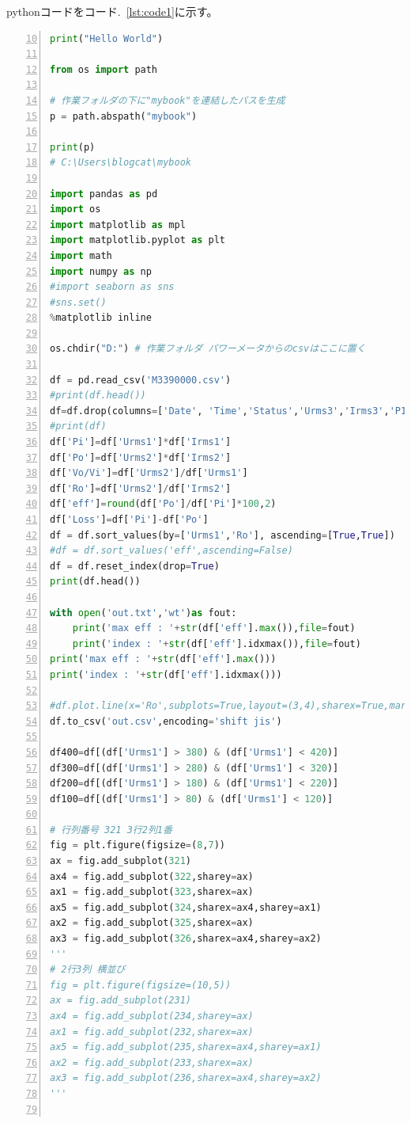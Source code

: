 \documentclass[
  10pt,
  a4paper,
  pandoc,
  titlepage]{ltjsarticle}
\begin{document}
pythonコードをコード.~\ref{lst:code1}に示す。

\begin{codelisting}

\caption{test.py}

\begin{lstlisting}[language=Python, numbers=left, firstnumber=10, caption={test.py}, label=lst:code1]
print("Hello World")

from os import path

# 作業フォルダの下に"mybook"を連結したパスを生成
p = path.abspath("mybook")

print(p)
# C:\Users\blogcat\mybook

import pandas as pd
import os
import matplotlib as mpl
import matplotlib.pyplot as plt
import math
import numpy as np
#import seaborn as sns
#sns.set()
%matplotlib inline

os.chdir("D:") # 作業フォルダ パワーメータからのcsvはここに置く

df = pd.read_csv('M3390000.csv')
#print(df.head())
df=df.drop(columns=['Date', 'Time','Status','Urms3','Irms3','P1','P2','P3','Eff1','Eff2','Loss1','Loss2'])
#print(df)
df['Pi']=df['Urms1']*df['Irms1']
df['Po']=df['Urms2']*df['Irms2']
df['Vo/Vi']=df['Urms2']/df['Urms1']
df['Ro']=df['Urms2']/df['Irms2']
df['eff']=round(df['Po']/df['Pi']*100,2)
df['Loss']=df['Pi']-df['Po']
df = df.sort_values(by=['Urms1','Ro'], ascending=[True,True])
#df = df.sort_values('eff',ascending=False)
df = df.reset_index(drop=True)
print(df.head())

with open('out.txt','wt')as fout:
    print('max eff : '+str(df['eff'].max()),file=fout)
    print('index : '+str(df['eff'].idxmax()),file=fout)
print('max eff : '+str(df['eff'].max()))
print('index : '+str(df['eff'].idxmax()))

#df.plot.line(x='Ro',subplots=True,layout=(3,4),sharex=True,marker='o')
df.to_csv('out.csv',encoding='shift jis')

df400=df[(df['Urms1'] > 380) & (df['Urms1'] < 420)]
df300=df[(df['Urms1'] > 280) & (df['Urms1'] < 320)]
df200=df[(df['Urms1'] > 180) & (df['Urms1'] < 220)]
df100=df[(df['Urms1'] > 80) & (df['Urms1'] < 120)]

# 行列番号 321 3行2列1番
fig = plt.figure(figsize=(8,7))
ax = fig.add_subplot(321)
ax4 = fig.add_subplot(322,sharey=ax)
ax1 = fig.add_subplot(323,sharex=ax)
ax5 = fig.add_subplot(324,sharex=ax4,sharey=ax1)
ax2 = fig.add_subplot(325,sharex=ax)
ax3 = fig.add_subplot(326,sharex=ax4,sharey=ax2)
'''
# 2行3列 横並び
fig = plt.figure(figsize=(10,5))
ax = fig.add_subplot(231)
ax4 = fig.add_subplot(234,sharey=ax)
ax1 = fig.add_subplot(232,sharex=ax)
ax5 = fig.add_subplot(235,sharex=ax4,sharey=ax1)
ax2 = fig.add_subplot(233,sharex=ax)
ax3 = fig.add_subplot(236,sharex=ax4,sharey=ax2)
'''


\end{lstlisting}
\end{codelisting}
\end{document}
